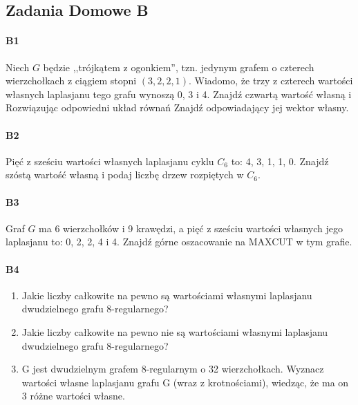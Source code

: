 \documentclass[a4paper,12pt]{article}
\theoremstyle{definition}%
\theoremstyle{definition}
\theoremstyle{problem}
\begin{document}
\subsection{Zadania Domowe B}
\paragraph{B1} Niech $G$ będzie ,,trójkątem z ogonkiem”, tzn. jedynym grafem o czterech wierzchołkach z ciągiem stopni $(3, 2, 2, 1)$. Wiadomo, że trzy z czterech wartości własnych laplasjanu tego grafu wynoszą 0, 3 i 4. Znajdź czwartą wartość własną i Rozwiązując odpowiedni układ równań Znajdź odpowiadający jej wektor własny.

\paragraph{B2} Pięć z sześciu wartości własnych laplasjanu cyklu $C_6$ to: 4, 3, 1, 1, 0. Znajdź szóstą wartość własną i podaj liczbę drzew rozpiętych w $C_6$.

\paragraph{B3} Graf $G$ ma 6 wierzchołków i 9 krawędzi, a pięć z sześciu wartości własnych jego laplasjanu to: 0, 2, 2, 4 i 4. Znajdź górne oszacowanie na MAXCUT w tym grafie.

\paragraph{B4}
\begin{enumerate}[label=\alph*)]
\item Jakie liczby całkowite na pewno są wartościami własnymi laplasjanu dwudzielnego grafu 8-regularnego?
\item Jakie liczby całkowite na pewno nie są wartościami własnymi laplasjanu dwudzielnego grafu 8-regularnego?
\item G jest dwudzielnym grafem 8-regularnym o 32 wierzchołkach. Wyznacz wartości własne laplasjanu grafu G (wraz z krotnościami), wiedząc, że ma on 3 różne wartości własne.
\end{enumerate}
\end{document}
